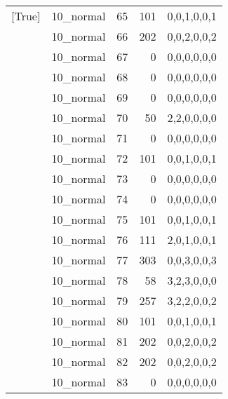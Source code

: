 \begin{tabular}{llrrl}
 [True]          & 10\_normal           &            65 &                   101 & 0,0,1,0,0,1   \\
 [True]          & 10\_normal           &            66 &                   202 & 0,0,2,0,0,2   \\
 [True]          & 10\_normal           &            67 &                     0 & 0,0,0,0,0,0   \\
 [True]          & 10\_normal           &            68 &                     0 & 0,0,0,0,0,0   \\
 [True]          & 10\_normal           &            69 &                     0 & 0,0,0,0,0,0   \\
 [True]          & 10\_normal           &            70 &                    50 & 2,2,0,0,0,0   \\
 [True]          & 10\_normal           &            71 &                     0 & 0,0,0,0,0,0   \\
 [True]          & 10\_normal           &            72 &                   101 & 0,0,1,0,0,1   \\
 [True]          & 10\_normal           &            73 &                     0 & 0,0,0,0,0,0   \\
 [True]          & 10\_normal           &            74 &                     0 & 0,0,0,0,0,0   \\
 [True]          & 10\_normal           &            75 &                   101 & 0,0,1,0,0,1   \\
 [True]          & 10\_normal           &            76 &                   111 & 2,0,1,0,0,1   \\
 [True]          & 10\_normal           &            77 &                   303 & 0,0,3,0,0,3   \\
 [True]          & 10\_normal           &            78 &                    58 & 3,2,3,0,0,0   \\
 [True]          & 10\_normal           &            79 &                   257 & 3,2,2,0,0,2   \\
 [True]          & 10\_normal           &            80 &                   101 & 0,0,1,0,0,1   \\
 [True]          & 10\_normal           &            81 &                   202 & 0,0,2,0,0,2   \\
 [True]          & 10\_normal           &            82 &                   202 & 0,0,2,0,0,2   \\
 [True]          & 10\_normal           &            83 &                     0 & 0,0,0,0,0,0   \\

\end{tabular}

